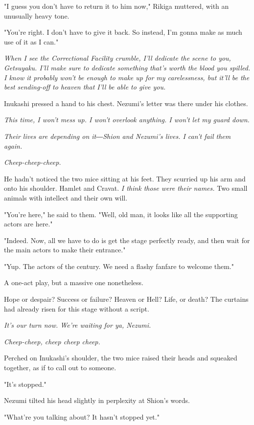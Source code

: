"I guess you don't have to return it to him now," Rikiga muttered, with
an unusually heavy tone.

"You're right. I don't have to give it back. So instead, I'm gonna make
as much use of it as I can."

\emph{When I see the Correctional Facility crumble, I'll dedicate the scene to
	you, Getsuyaku. I'll make sure to dedicate something that's worth the
	blood you spilled. I know it probably won't be enough to make up for my
	carelessness, but it'll be the best sending-off to heaven that I'll be
	able to give you.}

Inukashi pressed a hand to his chest. Nezumi's letter was there under
his clothes.

\emph{This time, I won't mess up. I won't overlook anything. I won't let my
	guard down.}

\emph{Their lives are depending on it―Shion and Nezumi's lives. I can't fail
	them again.}

\emph{Cheep-cheep-cheep.}

He hadn't noticed the two mice sitting at his feet. They scurried up his
arm and onto his shoulder. Hamlet and Cravat. \emph{I think those were their
	names.} Two small animals with intellect and their own will.

"You're here," he said to them. "Well, old man, it looks like all the
supporting actors are here."

"Indeed. Now, all we have to do is get the stage perfectly ready, and
then wait for the main actors to make their entrance."

"Yup. The actors of the century. We need a flashy fanfare to welcome
them."

A one-act play, but a massive one nonetheless.

Hope or despair? Success or failure? Heaven or Hell? Life, or death? The
curtains had already risen for this stage without a script.

\emph{It's our turn now. We're waiting for ya, Nezumi.}

\emph{Cheep-cheep, cheep cheep cheep.}

Perched on Inukashi's shoulder, the two mice raised their heads and
squeaked together, as if to call out to someone.

\myspace

"It's stopped."

Nezumi tilted his head slightly in perplexity at Shion's words.

"What're you talking about? It hasn't stopped yet."

